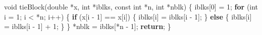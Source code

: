 \documentclass[
  12pt,
  letterpaper,
  DIV=11,
  numbers=noendperiod]{scrreprt}
\newenvironment{Shaded}{\begin{snugshade}}{\end{snugshade}}
\newcommand{\ControlFlowTok}[1]{\textcolor[rgb]{0.00,0.23,0.31}{\textbf{#1}}}
\newcommand{\DataTypeTok}[1]{\textcolor[rgb]{0.68,0.00,0.00}{#1}}
\newcommand{\DecValTok}[1]{\textcolor[rgb]{0.68,0.00,0.00}{#1}}
\newcommand{\NormalTok}[1]{\textcolor[rgb]{0.00,0.23,0.31}{#1}}
\newcommand{\OperatorTok}[1]{\textcolor[rgb]{0.37,0.37,0.37}{#1}}
\theoremstyle{remark}
\begin{document}
\begin{Shaded}
\begin{Highlighting}[]
\DataTypeTok{void}\NormalTok{ tieBlock}\OperatorTok{(}\DataTypeTok{double} \OperatorTok{*}\NormalTok{x}\OperatorTok{,} \DataTypeTok{int} \OperatorTok{*}\NormalTok{iblks}\OperatorTok{,} \DataTypeTok{const} \DataTypeTok{int} \OperatorTok{*}\NormalTok{n}\OperatorTok{,} \DataTypeTok{int} \OperatorTok{*}\NormalTok{nblk}\OperatorTok{)} \OperatorTok{\{}
\NormalTok{    iblks}\OperatorTok{[}\DecValTok{0}\OperatorTok{]} \OperatorTok{=} \DecValTok{1}\OperatorTok{;}
    \ControlFlowTok{for} \OperatorTok{(}\DataTypeTok{int}\NormalTok{ i }\OperatorTok{=} \DecValTok{1}\OperatorTok{;}\NormalTok{ i }\OperatorTok{\textless{}} \OperatorTok{*}\NormalTok{n}\OperatorTok{;}\NormalTok{ i}\OperatorTok{++)} \OperatorTok{\{}
        \ControlFlowTok{if} \OperatorTok{(}\NormalTok{x}\OperatorTok{[}\NormalTok{i }\OperatorTok{{-}} \DecValTok{1}\OperatorTok{]} \OperatorTok{==}\NormalTok{ x}\OperatorTok{[}\NormalTok{i}\OperatorTok{])} \OperatorTok{\{}
\NormalTok{            iblks}\OperatorTok{[}\NormalTok{i}\OperatorTok{]} \OperatorTok{=}\NormalTok{ iblks}\OperatorTok{[}\NormalTok{i }\OperatorTok{{-}} \DecValTok{1}\OperatorTok{];}
        \OperatorTok{\}} \ControlFlowTok{else} \OperatorTok{\{}
\NormalTok{            iblks}\OperatorTok{[}\NormalTok{i}\OperatorTok{]} \OperatorTok{=}\NormalTok{ iblks}\OperatorTok{[}\NormalTok{i }\OperatorTok{{-}} \DecValTok{1}\OperatorTok{]} \OperatorTok{+} \DecValTok{1}\OperatorTok{;}
        \OperatorTok{\}}
    \OperatorTok{\}}
    \OperatorTok{*}\NormalTok{nblk }\OperatorTok{=}\NormalTok{ iblks}\OperatorTok{[*}\NormalTok{n }\OperatorTok{{-}} \DecValTok{1}\OperatorTok{];}
    \ControlFlowTok{return}\OperatorTok{;}
\OperatorTok{\}}


\end{Highlighting}
\end{Shaded}
\end{document}
